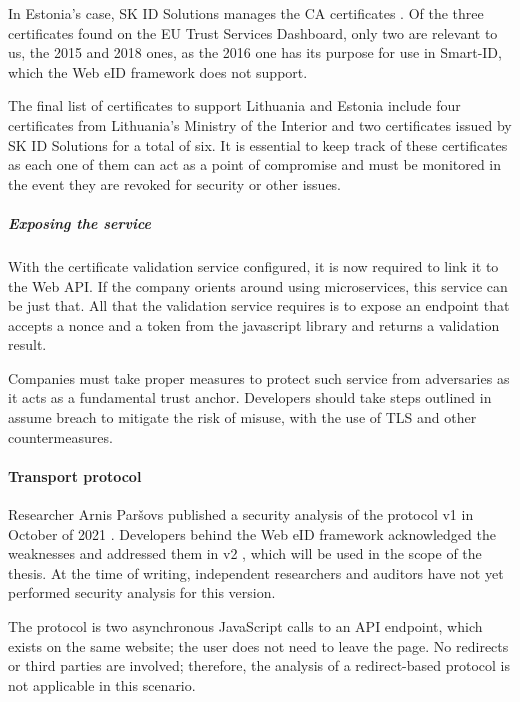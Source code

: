 In Estonia's case, SK ID Solutions manages the CA certificates \cite{eid-ee-skid-certificates}. Of the three certificates found on the EU Trust Services Dashboard, only two are relevant to us, the 2015 and 2018 ones, as the 2016 one has its purpose for use in Smart-ID, which the Web eID framework does not support.

The final list of certificates to support Lithuania and Estonia include four certificates from Lithuania's Ministry of the Interior and two certificates issued by SK ID Solutions for a total of six. It is essential to keep track of these certificates as each one of them can act as a point of compromise and must be monitored in the event they are revoked for security \cite{roca-vulnerability-lessons-learned} or other issues.


\subparagraph{Exposing the service}

With the certificate validation service configured, it is now required to link it to the Web API. If the company orients around using microservices, this service can be just that. All that the validation service requires is to expose an endpoint that accepts a nonce and a token from the javascript library and returns a validation result.

Companies must take proper measures to protect such service from adversaries as it acts as a fundamental trust anchor. Developers should take steps outlined in assume breach  to mitigate the risk of misuse, with the use of TLS and other countermeasures.

\paragraph{Transport protocol}

Researcher Arnis Paršovs published a security analysis of the protocol v1 in October of 2021 \cite{arnis-report-webeid}. Developers behind the Web eID framework acknowledged the weaknesses and addressed them in v2 \cite{ria-webeid-systemarchitecture}, which will be used in the scope of the thesis. At the time of writing, independent researchers and auditors have not yet performed security analysis for this version.

The protocol is two asynchronous JavaScript calls to an API endpoint, which exists on the same website; the user does not need to leave the page. No redirects or third parties are involved; therefore, the analysis of a redirect-based protocol is not applicable in this scenario.

